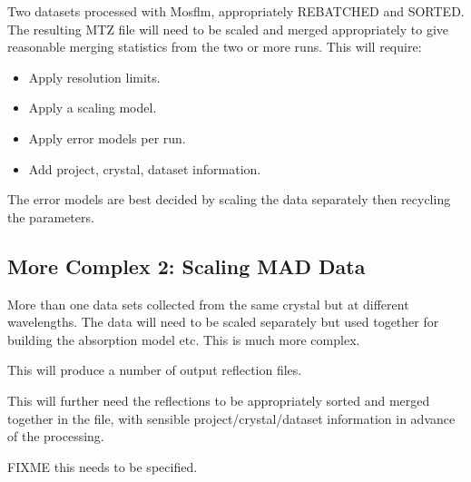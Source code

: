 \documentclass[a4paper, 11pt]{article}
\begin{document}
Two datasets processed with Mosflm, appropriately REBATCHED and SORTED. The
resulting MTZ file will need to be scaled and merged appropriately to give
reasonable merging statistics from the two or more runs. This will require:

\begin{itemize}
\item{Apply resolution limits.}
\item{Apply a scaling model.}
\item{Apply error models per run.}
\item{Add project, crystal, dataset information.}
\end{itemize}

The error models are best decided by scaling the data separately then 
recycling the parameters.

\subsection{More Complex 2: Scaling MAD Data}

More than one data sets collected from the same crystal but at different 
wavelengths. The data will need to be scaled separately but used together
for building the absorption model etc. This is much more complex.

This will produce a number of output reflection files.

This will further need the reflections to be appropriately sorted and 
merged together in the file, with sensible project/crystal/dataset information
in advance of the processing.

FIXME this needs to be specified.
\end{document}
